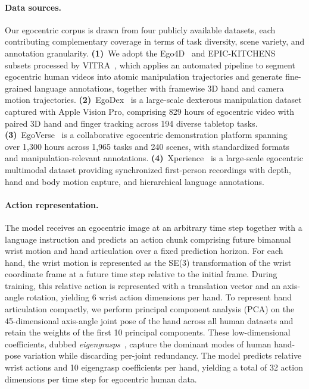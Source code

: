 \documentclass{article}
\begin{document}
\paragraph{Data sources.}
Our egocentric corpus is drawn from four publicly available datasets, each
contributing complementary coverage in terms of task diversity, scene variety,
and annotation granularity. %
%
\textbf{(1)}~We adopt the Ego4D~\citep{grauman2022ego4d} and
EPIC-KITCHENS~\citep{damen2022rescaling} subsets processed by
VITRA~\citep{li2025vitra}, which applies an automated pipeline to segment egocentric human videos into atomic manipulation trajectories and generate fine-grained language annotations, together with framewise 3D hand
and camera motion trajectories.
%
\textbf{(2)}~EgoDex~\citep{hoque2026egodex} is a large-scale dexterous manipulation dataset captured with Apple Vision Pro, comprising 829 hours of egocentric video with paired 3D hand and finger tracking across 194 diverse
tabletop tasks.
%
\textbf{(3)}~EgoVerse~\citep{punamiya2026egoverse} is a collaborative egocentric demonstration platform spanning over 1{,}300 hours across 1{,}965 tasks and 240 scenes, with standardized formats and manipulation-relevant annotations.
%
\textbf{(4)}~Xperience~\citep{ropedia2026xperience} is a large-scale egocentric multimodal dataset providing synchronized first-person recordings with depth, hand and body motion capture, and hierarchical language annotations.


\paragraph{Action representation.}
The model receives an egocentric image at an arbitrary time step together with a language instruction and predicts an action chunk comprising future bimanual wrist motion and hand articulation over a fixed prediction horizon. 
For each hand, the wrist motion is represented as the SE(3) transformation of the wrist coordinate frame at a future time step relative to the initial frame. During training, this relative action is represented with a translation vector and an axis-angle rotation, yielding 6 wrist action dimensions per hand.
To represent hand articulation compactly, we perform principal component analysis (PCA) on the 45-dimensional axis-angle joint pose of the hand across all human datasets and retain the weights of the first 10 principal components. These low-dimensional coefficients, dubbed \emph{eigengrasps}~\citep{ciocarlie2007dexterous, yuan2024crossdex}, capture the dominant modes of human hand-pose variation while discarding per-joint redundancy. The model predicts relative wrist actions and 10 eigengrasp coefficients per hand, yielding a total of 32 action dimensions per time step for egocentric human data.
\end{document}
